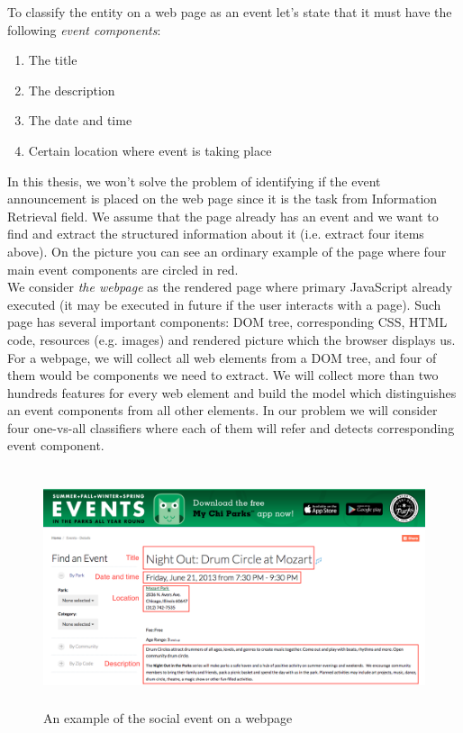 To classify the entity on a web page as an event let's state that it must have the following \textit{event components}:
\begin{enumerate}
    \item The title
    \item The description
    \item The date and time
    \item Certain location where event is taking place
\end{enumerate}

In this thesis, we won't solve the problem of identifying if the event announcement is placed on the web page since it is the task from Information Retrieval field. We assume that the page already has an event and we want to find and extract the structured information about it (i.e. extract four items above). On the picture  you can see an ordinary example of the page where four main event components are circled in red.\\

We consider \textit{the webpage} as the rendered page where primary JavaScript already executed (it may be executed in future if the user interacts with a page). Such page has several important components: DOM tree, corresponding CSS, HTML code, resources (e.g. images) and rendered picture which the browser displays us. \\

For a webpage, we will collect all web elements from a DOM tree, and four of them would be components we need to extract. We will collect more than two hundreds features for every web element and build the model which distinguishes an event components from all other elements. In our problem we will consider four one-vs-all classifiers where each of them will refer and detects corresponding event component. 

\begin{figure}[h]
\begin{center}
\includegraphics[height=7cm]{figures01/event_example}
\caption{An example of the social event on a webpage}
\label{fig:webevent}
\end{center}
\end{figure}


